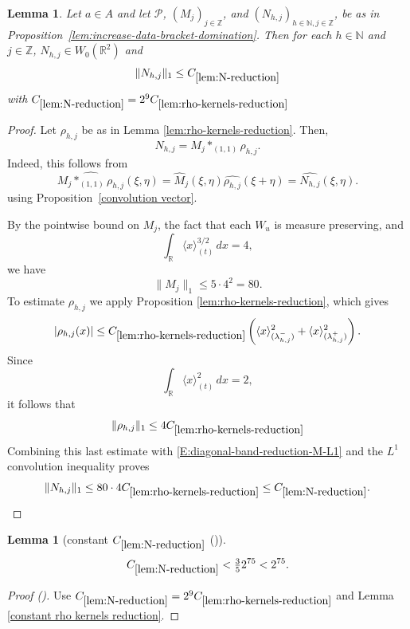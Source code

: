 \documentclass[12pt,reqno]{amsart}
\newcommand{\auto}{{({\tiny\faCar})}}
\theoremstyle{plain}
\newtheorem{lemma}[theorem]{Lemma}
\numberwithin{equation}{section}
\theoremstyle{remark}
\newcommand{\uses}[1]{}
\newcommand{\usesdefs}[1]{}
\newcommand{\Z}{{\mathbb Z}}
\newcommand{\R}{{\mathbb R}}
\newcommand{\N}{{\mathbb N}}
\begin{document}
\begin{lemma}
\label{lem:N-reduction}\uses{lem:rho-kernels-reduction,convolution vector,lem:increase-data-bracket-domination}\usesdefs{bracket bump,auto:Wiener-space-definition,auto:convolution-along-vector-definition,multiplicatively spaced monotone sequences,auto:unitary-matrices-definition} Let $a\in A$ and let $\mathcal P$, $(M_j)_{j\in \Z}$, and $(N_{h,j})_{h\in \N,j\in \Z}$,  be as in Proposition~\ref{lem:increase-data-bracket-domination}.
Then for each $h\in \N$ and $j\in \Z$,   $N_{h,j}\in W_0(\R^2)$ and
\begin{equation}
    \label{E:diagonal-band-reduction-N-L1}
    \|N_{h,j}\|_1\leq  C_{\ref{lem:N-reduction}}
\end{equation}
with $C_{\ref{lem:N-reduction}} = 2^9C_{\ref{lem:rho-kernels-reduction}}$
\end{lemma}
\begin{proof}
Let \(\rho_{h,j}\) be as in Lemma \ref{lem:rho-kernels-reduction}.
Then,
\[
N_{h,j}=M_j\ast_{(1,1)}\rho_{h,j}.
\]
Indeed, this follows from
\[
\widehat{M_j\ast_{(1,1)}\rho_{h,j}}(\xi,\eta)
=
\widehat M_j(\xi,\eta)
\widehat{\rho_{h,j}}(\xi+\eta)
=
\widehat{N_{h,j}}(\xi,\eta).
\]
using Proposition~\ref{convolution vector}.


By the pointwise bound on \(M_j\), the fact that each
\(W_u\) is measure preserving, and
\[
\int_{\mathbb R}\langle x\rangle_{(t)}^{3/2}\,dx=4,
\]
we have
\begin{equation}
    \label{E:diagonal-band-reduction-M-L1}
    \|M_j\|_1
    \leq
    5\cdot 4^2
    =
    80.
\end{equation}
 To estimate  $\rho_{h,j}$  we   apply  Proposition \ref{lem:rho-kernels-reduction},
which gives
\[
|\rho_{h,j}(x)|
\leq
C_{\ref{lem:rho-kernels-reduction}}
\left(
\langle x\rangle_{(\lambda_{h,j}^-)}^2
+
\langle x\rangle_{(\lambda_{h,j}^+)}^2
\right).
\]
Since
\[
\int_{\mathbb R}\langle x\rangle_{(t)}^2\,dx=2,
\]
it follows that
\[
\|\rho_{h,j}\|_1
\leq
4C_{\ref{lem:rho-kernels-reduction}}
\]
Combining this last estimate with
\eqref{E:diagonal-band-reduction-M-L1} and the \(L^1\) convolution
inequality proves
\[
\|N_{h,j}\|_1
\leq
80\cdot 4 C_{\ref{lem:rho-kernels-reduction}}
\leq
C_{\ref{lem:N-reduction}}.
\]
\end{proof}

\begin{lemma}[constant $C_{\ref{lem:N-reduction}}$ \auto]\label{constant N reduction}\uses{lem:N-reduction,lem:rho-kernels-reduction,constant rho kernels reduction}\usesdefs{}
\begin{equation}\label{constant N reduction bound}
C_{\ref{lem:N-reduction}}
<\tfrac35 2^{75}<2^{75}.
\end{equation}
\end{lemma}
\begin{proof}[Proof \auto]
Use $C_{\ref{lem:N-reduction}}=2^9C_{\ref{lem:rho-kernels-reduction}}$ and Lemma \ref{constant rho kernels reduction}.
\end{proof}
\end{document}

